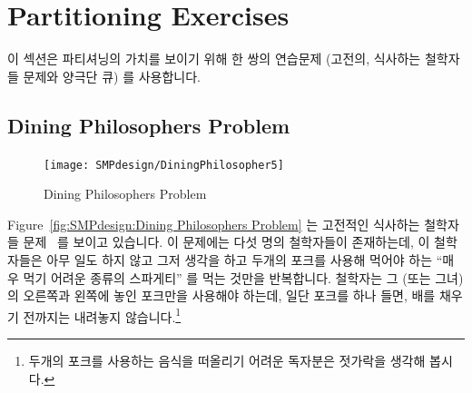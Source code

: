 
\section{Partitioning Exercises}
\label{sec:SMPdesign:Partitioning Exercises}

이 섹션은 파티셔닝의 가치를 보이기 위해 한 쌍의 연습문제 (고전의, 식사하는
철학자들 문제와 양극단 큐) 를 사용합니다.

\subsection{Dining Philosophers Problem}
\label{sec:SMPdesign:Dining Philosophers Problem}

\begin{figure}[tb]
\centering
\texttt{[image: SMPdesign/DiningPhilosopher5]}
\caption{Dining Philosophers Problem}
\end{figure}

Figure~\ref{fig:SMPdesign:Dining Philosophers Problem} 는 고전적인 식사하는
철학자들 문제~\cite{Dijkstra1971HOoSP} 를 보이고 있습니다.
이 문제에는 다섯 명의 철학자들이 존재하는데, 이 철학자들은 아무 일도 하지 않고
그저 생각을 하고 두개의 포크를 사용해 먹어야 하는 ``매우 먹기 어려운 종류의
스파게티'' 를 먹는 것만을 반복합니다.
철학자는 그 (또는 그녀) 의 오른쪽과 왼쪽에 놓인 포크만을 사용해야 하는데, 일단
포크를 하나 들면, 배를 채우기 전까지는 내려놓지 않습니다.\footnote{
	두개의 포크를 사용하는 음식을 떠올리기 어려운 독자분은 젓가락을 생각해
	봅시다.}

